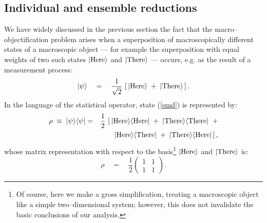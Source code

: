 \documentclass[12pt]{article}
\begin{document}
\subsection{Individual and ensemble reductions} \label{sec41}

We have widely discussed in the previous section the fact that the
macro--objectification problem arises when a superposition of
macroscopically different states of a macroscopic object --- for
example the superposition with equal weights of two such states
$|\makebox{Here}\rangle$ and $|\makebox{There}\rangle$ --- occurs,
e.g. as the result of a measurement process:
\begin{equation} \label{smd}
|\psi\rangle \quad = \quad \frac{1}{\sqrt{2}}\,\left[\,
|\makebox{Here}\rangle \; + \; |\makebox{There}\rangle\, \right].
\end{equation}
In the language of the statistical operator, state (\ref{smd}) is
represented by:
\begin{eqnarray}
\rho \; \equiv \; |\psi\rangle\langle\psi| & = &
\frac{1}{2}\,\left[\, |\makebox{Here}\rangle\langle\makebox{Here}|
\; + \; |\makebox{There}\rangle\langle\makebox{There}| \right.\; +
\nonumber \\ & &
\quad\left.|\makebox{Here}\rangle\langle\makebox{There}| \; + \;
|\makebox{There}\rangle\langle\makebox{Here}|\, \right],
\end{eqnarray}
whose matrix representation with respect to the basis\footnote{ Of
course, here we make a gross simplification, treating a
macroscopic object like a simple two--dimensional system; however,
this does not invalidate the basic conclusions of our analysis.}
$|\makebox{Here}\rangle$ and $|\makebox{There}\rangle$ is:
\begin{equation}
\rho \quad = \quad \frac{1}{2} \left(
\begin{array}{cc}
1 & 1 \\ 1 & 1
\end{array}
\right).
\end{equation}
\end{document}
